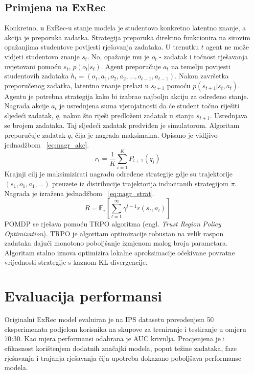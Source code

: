 \documentclass[times, utf8,projekt]{fer}
\begin{document}
\subsection{Primjena na ExRec}
Konkretno, u ExRec-u stanje modela je studentovo konkretno latentno znanje, a akcija je preporuka zadatka. Strategija preporuka direktno funkcionira na sirovim opažanjima studentove povijesti rješavanja zadataka. U trenutku $t$ agent ne može vidjeti studentovo znanje $s_t$. No, opažanje mu je $o_t$ - zadatak i točnost rješavanja uvjetovani pomoću $s_t$, $p(o_t|s_t)$. Agent preporučuje $a_t$ na temelju povijesti studentovih zadataka $h_t=(o_1, a_1, o_2, a_2, ..., o_{t-1},a_{t-1})$. Nakon završetka preporučenog zadatka, latentno znanje prelazi u $s_{t+1}$ pomoću $p(s_{t+1}|s_t, a_t)$.\newline
Agentu je potrebna strategija kako bi izabrao najbolju akciju za određeno stanje. Nagrada akcije $a_t$ je usrednjena suma vjerojatnosti da će student točno riješiti sljedeći zadatak, $q$, nakon što riješi predloženi zadatak u stanju $s_{t+1}$. Usrednjava se brojem zadataka. Taj sljedeći zadatak predviđen je simulatorom. Algoritam preporučuje zadatak $q$, čija je nagrada maksimalna. Opisano je vidljivo jednadžbom ~\ref{eq:nagr_akc}.\newline
\begin{equation}
r_{t}=\frac{1}{K} \sum_{i=1}^{K} P_{t+1}\left(q_{i}\right)\label{eq:nagr_akc}
\end{equation}
\newline
\newline
Krajnji cilj je maksimizirati nagradu određene strategije gdje su trajektorije $(s_1, o_1, a_1, ...)$ preuzete iz distribucije trajektorija induciranih strategijom $\pi$. Nagrada je izražena jednadžbom ~\ref{eq:nagr_strat}. \newline
\begin{equation}
R=\mathbb{E}_{\tau}\left[\sum_{t=1}^{\infty} \gamma^{t-1} r\left(s_{t}, a_{t}\right)\right]\label{eq:nagr_strat}
\end{equation}
\newline
POMDP se rješava pomoću TRPO algoritma (engl. \textit{Trust Region Policy Optimization}). TRPO je algoritam optimizacije robustan na velik raspon zadataka dajući monotono poboljšanje izmjenom malog broja parametara. Algoritam stalno iznova optimizira lokalne aproksimacije očekivane povratne vrijednosti strategije s kaznom KL-divergencije.\newline
\newline
\section{Evaluacija performansi}
Originalni ExRec model evaluiran je na IPS datasetu provodenjem 50 eksperimenata podjelom korisnika na skupove za treniranje i testiranje u omjeru 70:30. Kao mjera performansi odabrana je AUC krivulja. Procjenjena je i efikasnost korištenjem dodatnih značajki modela, poput težine zadataka, faze rješavanja i trajanja rješavanja čija upotreba dokazano poboljšava performanse modela. 
\end{document}
